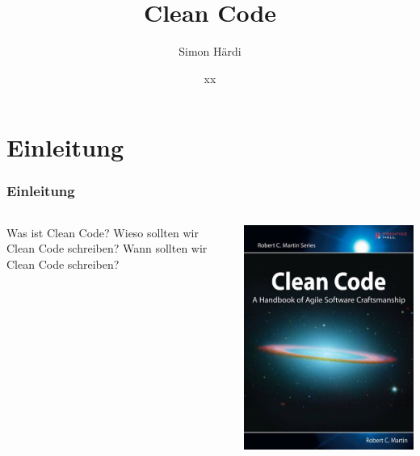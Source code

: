 \documentclass{beamer}
\title[CleanCode]{Clean Code}
\author{Simon Härdi}
\institute{Institute for Computational Engineering}
\date{xx}
\begin{document}
{
\begin{frame}
\maketitle
\end{frame}
}


\section{Einleitung}
\begin{frame}
\frametitle{Einleitung}
\begin{columns}
    \begin{column}{0.6\textwidth}
        \begin{outline}
            \1 Was ist Clean Code?
            \1 Wieso sollten wir Clean Code schreiben?
            \1 Wann sollten wir Clean Code schreiben?
        \end{outline}
    \end{column}
    \begin{column}{0.4\textwidth}
        \includegraphics[width=\linewidth]{cleanCodeBook.jpg}
    \end{column}
\end{columns}
\end{frame}
\end{document}
